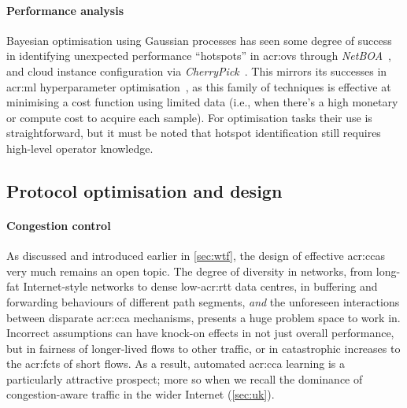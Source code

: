 \paragraph{Performance analysis}
Bayesian optimisation using Gaussian processes has seen some degree of success in identifying unexpected performance ``hotspots'' in \gls{acr:ovs} through \emph{NetBOA}~\parencite{DBLP:conf/sigcomm/ZerwasKHRKB019}, and cloud instance configuration via \emph{CherryPick}~\parencite{DBLP:conf/nsdi/AlipourfardLCVY17}.
This mirrors its successes in \gls{acr:ml} hyperparameter optimisation~\parencite{DBLP:conf/lion/HutterHL11,DBLP:conf/aaai/FeurerSH15}, as this family of techniques is effective at minimising a cost function using limited data (i.e., when there's a high monetary or compute cost to acquire each sample).
For optimisation tasks their use is straightforward, but it must be noted that hotspot identification still requires high-level operator knowledge.

\subsection{Protocol optimisation and design}
\paragraph{Congestion control}
As discussed and introduced earlier in \cref{sec:wtf}, the design of effective \glspl{acr:cca} very much remains an open topic.
The degree of diversity in networks, from long-fat Internet-style networks to dense low-\gls{acr:rtt} data centres, in buffering and forwarding behaviours of different path segments, \emph{and} the unforeseen interactions between disparate \gls{acr:cca} mechanisms, presents a huge problem space to work in.
Incorrect assumptions can have knock-on effects in not just overall performance, but in fairness of longer-lived flows to other traffic, or in catastrophic increases to the \glspl{acr:fct} of short flows.
As a result, automated \gls{acr:cca} learning is a particularly attractive prospect; more so when we recall the dominance of congestion-aware traffic in the wider Internet (\cref{sec:uk}).

